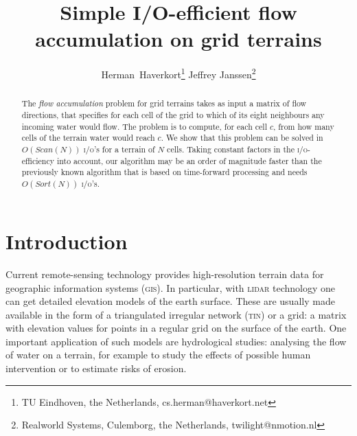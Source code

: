 \documentclass[10pt,a4paper]{article}
\title{Simple I/O-efficient flow accumulation on grid terrains}
\author{Herman~Haverkort\thanks{TU Eindhoven, the Netherlands, cs.herman@haverkort.net}
\hspace{.3cm}
Jeffrey Janssen\thanks{Realworld Systems, Culemborg, the Netherlands, twilight@nmotion.nl}
}
\date{}
\def\tin{\textsc{tin}\xspace}
\def\gis{\textsc{gis}\xspace}
\def\lidar{\textsc{lidar}\xspace}
\def\io{\textsc{i/o}\xspace}
\def\ios{\textsc{i/o}'s\xspace}
\def\sort{\mathit{Sort}}
\def\scan{\mathit{Scan}}
\begin{document}
\maketitle

\begin{abstract}
The \emph{flow accumulation} problem for grid terrains takes as input a matrix of flow directions, that specifies for each cell of the grid to which of its eight neighbours any incoming water would flow. The problem is to compute, for each cell $c$, from how many cells of the terrain water would reach $c$. We show that this problem can be solved in $O(\scan(N))$ \ios for a terrain of $N$ cells. Taking constant factors in the \io-efficiency into account, our algorithm may be an order of magnitude faster than the previously known algorithm that is based on time-forward processing and needs $O(\sort(N))$ \ios.
\end{abstract}

\section{Introduction}
Current remote-sensing technology provides high-resolution terrain data for geographic information systems (\gis). In particular, with \lidar technology one can get detailed elevation models of the earth surface. These are usually made available in the form of a triangulated irregular network (\tin) or a grid: a matrix with elevation values for points in a regular grid on the surface of the earth. One important application of such models are hydrological studies: analysing the flow of water on a terrain, for example to study the effects of possible human intervention or to estimate risks of erosion.
\end{document}
